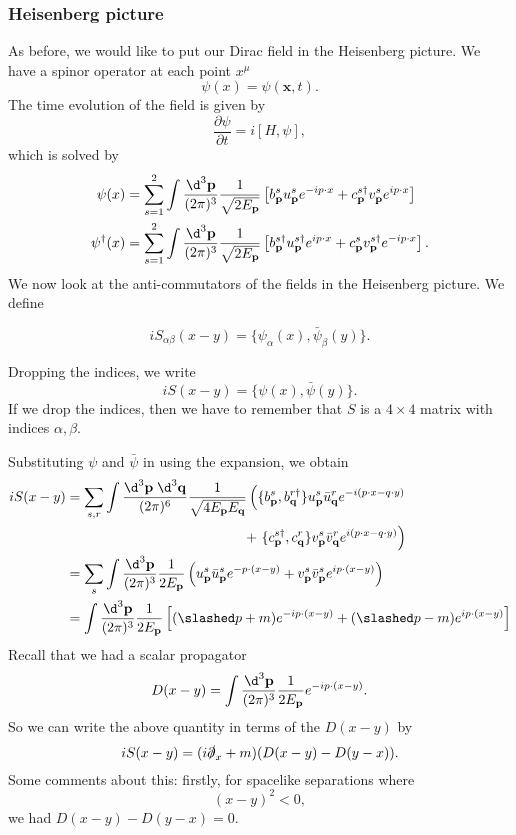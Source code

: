 \documentclass[a4paper]{article}
\begin{document}
\subsubsection*{Heisenberg picture}
As before, we would like to put our Dirac field in the Heisenberg picture. We have a spinor operator at each point $x^\mu$
\[
  \psi(x) = \psi(\mathbf{x}, t).
\]
The time evolution of the field is given by
\[
  \frac{\partial \psi}{\partial t} = i [H, \psi],
\]
which is solved by
\begin{align*}
  \psi(x) &= \sum_{s = 1}^2 \int \frac{\d^3 \mathbf{p}}{(2\pi)^3} \frac{1}{\sqrt{2E_\mathbf{p}}} \left[b_\mathbf{p}^s u_\mathbf{p}^s e^{-ip\cdot x} + c_\mathbf{p}^{s\dagger}v_\mathbf{p}^s e^{ip\cdot x}\right]\\
  \psi^\dagger(x) &= \sum_{s = 1}^2 \int \frac{\d^3 \mathbf{p}}{(2\pi)^3} \frac{1}{\sqrt{2E_\mathbf{p}}} \left[b_\mathbf{p}^{s\dagger} u_\mathbf{p}^{s\dagger} e^{ip\cdot x} + c_\mathbf{p}^{s}v_\mathbf{p}^{s\dagger} e^{-ip\cdot x}\right].
\end{align*}
We now look at the anti-commutators of the fields in the Heisenberg picture. We define
\begin{defi}
  \[
    i S_{\alpha\beta}(x - y) = \{\psi_\alpha(x), \bar\psi_\beta(y)\}.
  \]
\end{defi}
Dropping the indices, we write
\[
  i S(x - y) = \{\psi(x), \bar\psi(y)\}.
\]
If we drop the indices, then we have to remember that $S$ is a $4 \times 4$ matrix with indices $\alpha, \beta$.

Substituting $\psi$ and $\bar\psi$ in using the expansion, we obtain
\begin{align*}
  iS(x - y) &= \sum_{s, r} \int \frac{\d^3 \mathbf{p}\; \d^3 \mathbf{q}}{(2\pi)^6} \frac{1}{\sqrt{4E_\mathbf{p} E_\mathbf{q}}} \left(\{b_\mathbf{p}^s, b_\mathbf{q}^{r\dagger}\} u_\mathbf{p}^s \bar u_\mathbf{q}^r e^{-i(p\cdot x - q \cdot y)}\right.\\
  &\hphantom{=\sum_{s, r} \int \frac{\d^3 \mathbf{p}\; \d^3 \mathbf{q}}{(2\pi)^6} \frac{1}{\sqrt{4E_\mathbf{p} E_\mathbf{q}}} } +\left.\{c_\mathbf{p}^{s\dagger},c_\mathbf{q}^r \} v_\mathbf{p}^s \bar v_\mathbf{q}^r e^{i(p\cdot x - q \cdot y)}\right)\\
  &= \sum_s \int \frac{\d^3 \mathbf{p}}{(2\pi)^3} \frac{1}{2 E_\mathbf{p}} \left(u_\mathbf{p}^s \bar u_\mathbf{p}^s e^{-p\cdot(x - y)} + v_\mathbf{p}^s \bar v_\mathbf{p}^s e^{ip\cdot(x - y)}\right)\\
  &= \int \frac{\d^3 \mathbf{p}}{(2\pi)^3} \frac{1}{2 E_\mathbf{p}} \left[(\slashed p + m) e^{-ip\cdot (x - y)} + (\slashed p - m) e^{i p\cdot (x - y)}\right]
\end{align*}
Recall that we had a scalar propagator
\[
  D(x - y) = \int \frac{\d^3 \mathbf{p}}{(2\pi)^3} \frac{1}{2 E_\mathbf{p}} e^{-ip\cdot (x - y)}.
\]
So we can write the above quantity in terms of the $D(x - y)$ by
\[
  iS(x - y) = (i \slashed \partial_x + m)(D(x - y) - D(y - x)).
\]
Some comments about this: firstly, for spacelike separations where
\[
  (x - y)^2 < 0,
\]
we had $D(x - y) - D(y - x) = 0$.
\end{document}
